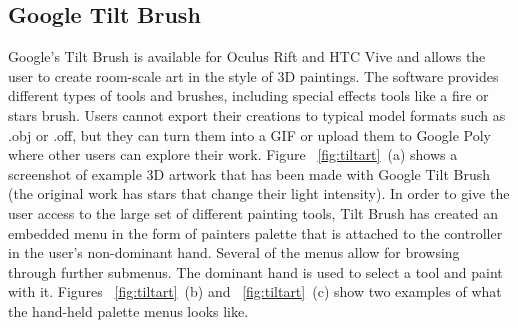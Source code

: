\subsection{Google Tilt Brush}
Google's Tilt Brush is available for Oculus Rift and HTC Vive and allows the user to  create room-scale art in the style of 3D paintings. The software provides different types of tools and brushes, including special effects tools like a fire or stars brush. Users cannot export their creations to typical model formats such as .obj or .off, but they can turn them into a GIF or upload them to Google Poly where other users can explore their work.
Figure ~\ref{fig:tiltart}~(a) shows a screenshot of example 3D artwork that has been made with Google Tilt Brush (the original work has stars that change their light intensity). In order to give the user access to the large set of different painting tools, Tilt Brush has created an embedded menu in the form of painters palette that is attached to the controller in the user's non-dominant hand. Several of the menus allow for browsing through further submenus. The dominant hand is used to select a tool and paint with it. Figures ~\ref{fig:tiltart}~(b) and ~\ref{fig:tiltart}~(c) show two examples of what the hand-held palette menus looks like.



